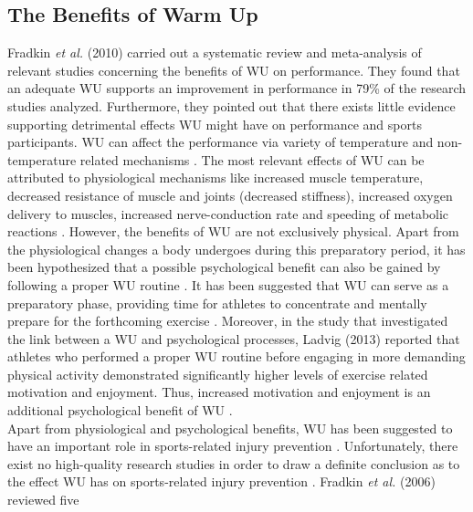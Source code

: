 \subsection{The Benefits of Warm Up}
Fradkin \textit{et al.} (2010) carried out a systematic review and meta-analysis of relevant studies concerning the benefits of WU on performance. They found that an adequate WU supports an improvement in performance in 79\% of the research studies analyzed. Furthermore, they pointed out that there exists little evidence supporting detrimental effects WU might have on performance and sports participants.
WU can affect the performance via variety of temperature and non-temperature related mechanisms \cite{bishop2003warm1}. 
The most relevant effects of WU can be attributed to physiological mechanisms like increased muscle temperature, decreased resistance of muscle and joints (decreased stiffness), increased oxygen delivery to muscles, increased nerve-conduction rate and speeding of metabolic reactions \cite{bishop2003warm1}. 
However, the benefits of WU are not exclusively physical. Apart from the physiological changes a body undergoes during this preparatory period, it has been hypothesized that a possible psychological benefit can also be gained by following a proper WU routine \cite{bishop2003warm1,shellock1985warming}.
It has been suggested that WU can serve as a preparatory phase, providing time for athletes to concentrate and mentally prepare for the forthcoming exercise \cite{shellock1985warming}. 
Moreover, in the study that investigated the link between a WU and psychological processes, Ladvig (2013) reported that athletes who performed a proper WU routine before engaging in more demanding physical activity demonstrated significantly higher levels of exercise related motivation and enjoyment. Thus, increased motivation and enjoyment is an additional psychological benefit of WU \cite{ladwig2013psychological}.
\\Apart from physiological and psychological benefits, WU has been suggested to have an important role in sports-related injury prevention \cite{shellock1985warming}. Unfortunately, there exist no high-quality research studies in order to draw a definite conclusion as to the effect WU has on sports-related injury prevention \cite{fields2007should}. Fradkin \textit{et al.} (2006) reviewed five
